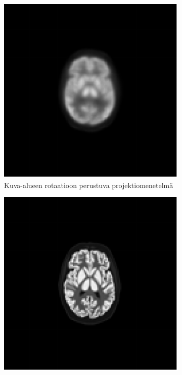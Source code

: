 \begin{figure}[H]
    \centering
    \captionsetup{width=.9\linewidth}
    \begin{subfigure}[t]{.25\textwidth}
        \includegraphics[width=\linewidth]{kuvat/cbf_rekonstruktio_proj6.pdf}
        \caption{Kuva-alueen rotaatioon perustuva projektiomenetelmä}
    \end{subfigure}%
    \hspace{.075\textwidth}%
    \begin{subfigure}[t]{.25\textwidth}
        \includegraphics[width=\linewidth]{kuvat/cbf_ground_truth.pdf}

\end{subfigure}
\end{figure}
